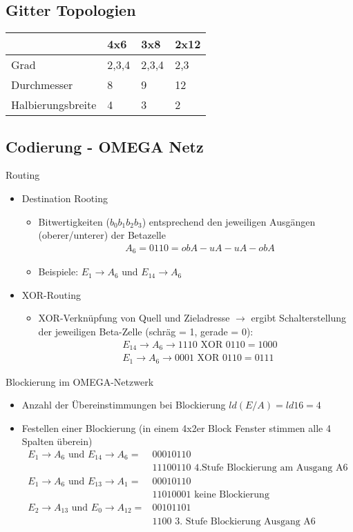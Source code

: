 \subsection{Gitter Topologien}
\begin{tabularx}{\textwidth}{|X|X|X|X|}
\hline
&4x6 &3x8 &2x12\\
\hline
Grad &2,3,4 &2,3,4 &2,3\\
\hline
Durchmesser &8 &9 &12\\
\hline
Halbierungsbreite &4 &3 &2\\
\hline
\end{tabularx}
\subsection{Codierung - OMEGA Netz}
Routing
\begin{itemize}
	\item Destination Rooting
	\begin{itemize}
		\item Bitwertigkeiten ($b_0b_1b_2b_3$) entsprechend den jeweiligen Ausgängen (oberer/unterer) der Betazelle
		\begin{align*}
			&A_6 = 0110 = obA - uA - uA - obA
		\end{align*}
		\item Beispiele: $E_1 \to A_6$ und $E_{14}\to A_6$
	\end{itemize}
	\item XOR-Routing
	\begin{itemize}
		\item XOR-Verknüpfung von Quell und Zieladresse $\to$ ergibt Schalterstellung der jeweiligen Beta-Zelle (schräg = 1, gerade = 0):
		\begin{align*}
			&E_{14} \to A_6 \to 1110 \text{ XOR } 0110 = 1000\\
			&E_1 \to A_6 \to 0001 \text{ XOR } 0110 = 0111
		\end{align*}
	\end{itemize}
\end{itemize}
Blockierung im OMEGA-Netzwerk
\begin{itemize}
	\item Anzahl der Übereinstimmungen bei Blockierung $ld(E/A) = ld 16 = 4$
	\item Festellen einer Blockierung (in einem  4x2er Block Fenster stimmen alle 4 Spalten überein)
	\begin{align*}
		E_1 \to A_6 \text{ und }E_{14} \to A_6 = &0001 0110\\
		&1110 0110 \text{ 4.Stufe Blockierung am Ausgang A6}\\
		E_1 \to A_6 \text{ und }E_{13} \to A_1 = &0001 0110\\
		&1101 0001 \text{ keine Blockierung}\\
		E_2 \to A_{13} \text{ und } E_0 \to A_{12} = &0010 1101\\
		&1100 \text{ 3. Stufe Blockierung Ausgang A6}
	\end{align*}
\end{itemize}
